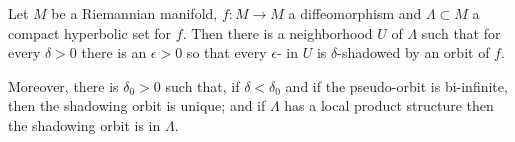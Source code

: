 \documentclass[12pt]{article}
\begin{document}
Let $M$ be a Riemannian manifold, $f\colon M\to M$ a diffeomorphism and $\Lambda\subset M$ a compact hyperbolic set for $f$. Then there is a neighborhood $U$ of $\Lambda$ such that for every $\delta>0$ there is an $\epsilon>0$ so that every $\epsilon$- in $U$ is $\delta$-shadowed by an orbit of $f$. 

Moreover, there is $\delta_0>0$ such that, if $\delta<\delta_0$ and if the pseudo-orbit is bi-infinite, 
then the shadowing orbit is unique; and if $\Lambda$ has a local product structure then the shadowing orbit is in $\Lambda$.
\end{document}
